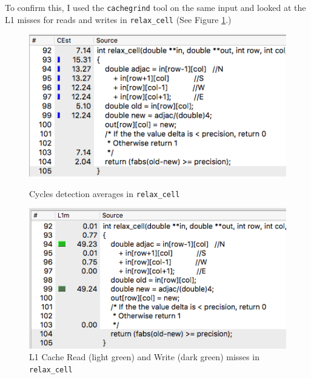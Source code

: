 \documentclass[12pt]{article}
\begin{document}
To confirm this, I used the \texttt{cachegrind} tool on the same input and looked at the L1 misses for reads and writes in \texttt{relax\_cell} (See Figure \ref{fig:source-misses}.)

\begin{figure}[!htb]
    \begin{minipage}{.49\textwidth}
        \hspace{-0.3cm}\includegraphics[width=\textwidth]{img/source-cycles}
        \centering\caption{Cycles detection averages in \texttt{relax\_cell}}
        \label{fig:source-cycles}
    \end{minipage}\hspace{0.8cm}
    \begin{minipage}{0.49\textwidth}
       \hspace{-0.3cm}\includegraphics[width=\textwidth]{img/source-misses.png}
        \centering\caption{L1 Cache Read (light green) and Write (dark green) misses in \texttt{relax\_cell}}
        \label{fig:source-misses}
    \end{minipage}
\end{figure}
\end{document}
